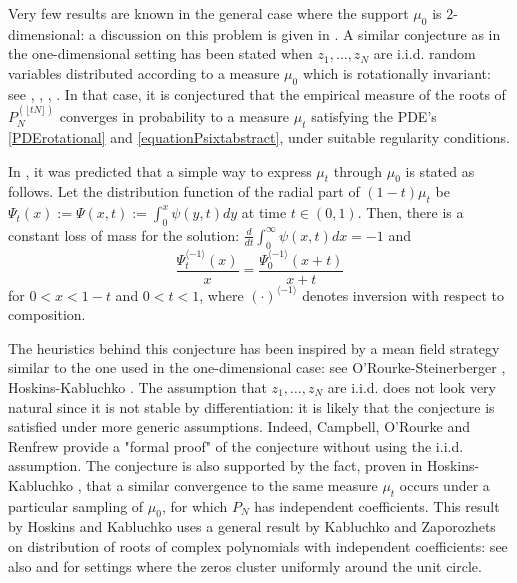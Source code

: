 \documentclass[11pt]{amsart}
\begin{document}
Very few results are known in the general case where the support $\mu_0$ is $2$-dimensional: a discussion on this problem is given in \cite{Galligo}. A similar conjecture as in the one-dimensional setting has been stated when $z_1, \dots, z_N$ are i.i.d. random variables distributed according to a measure $\mu_0$ which is rotationally invariant: see \cite{hoskins2021dynamics}, \cite{steinerberger2019nonlocal}, \cite{o2021nonlocal}, \cite{hoskins2022semicircle}. In that case, it is conjectured that the empirical measure of the roots of $P_N^{(\lfloor tN \rfloor)}$ converges in probability to a measure $\mu_t$ satisfying 
the PDE's \eqref{PDErotational} and \eqref{equationPsixtabstract}, under suitable regularity conditions. 


In \cite{hoskins2021dynamics}, it was predicted that a simple way to express $\mu_t$ through $\mu_0$ is stated as follows. Let the distribution function of the radial part of $(1-t) \mu_t$ be
	$\Psi_t(x) := \Psi(x,t) := \int_0^x \psi(y, t) dy $
	at time $t \in (0,1)$. Then, there is a constant loss of mass for the solution: 
			$ \frac{d}{dt} \int_0^\infty \psi(x,t) d x = -1 $ and
\begin{equation} \label{Psi} \frac{ \Psi_t^{\langle -1 \rangle}(x)}{x}  =  \frac{ \Psi_0^{\langle -1 \rangle}(x+t)}{x+t} 
\end{equation}
	for $0 < x < 1-t$ and $0 <  t < 1 $, where  $( \cdot )^{\langle -1 \rangle}$ denotes inversion with respect to composition.  


The heuristics behind this conjecture has been inspired by a mean field strategy similar to the one used in the one-dimensional case: see O’Rourke-Steinerberger \cite{o2021nonlocal}, Hoskins-Kabluchko \cite{hoskins2021dynamics}. The assumption 
that $z_1, \dots, z_N$ are i.i.d. does not look very natural since it is not stable by differentiation: it is likely that the conjecture is satisfied under more generic assumptions. Indeed, Campbell, O’Rourke and Renfrew \cite{campbell2024fractional} provide a "formal proof" of the conjecture without using the i.i.d. assumption. The conjecture is also supported by the fact, proven in Hoskins-Kabluchko \cite{hoskins2021dynamics}, that a similar convergence to the same measure $\mu_t$ occurs under a particular sampling of $\mu_0$, for which $P_N$ has independent coefficients. This result by Hoskins and Kabluchko uses a general result by Kabluchko and Zaporozhets \cite{kabluchko2014asymptotic} on distribution of roots of complex polynomials with independent coefficients: see also \cite{Hughes-Nikeghbali} and \cite{ibragimov2012distribution} for settings where the zeros cluster uniformly around the unit circle. 
\end{document}
